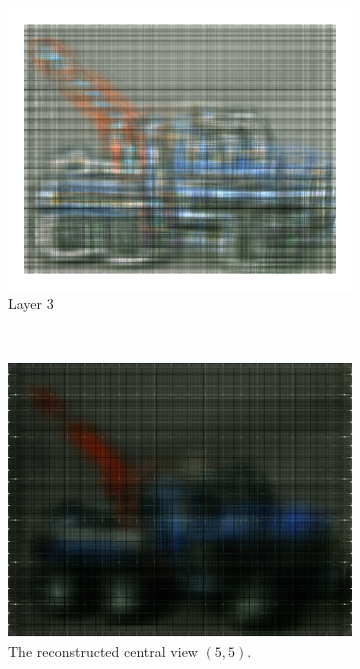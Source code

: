 \documentclass[11pt,a4paper,titlepage]{article}
\begin{document}
\begin{figure}[h]
\begin{subfigure}[c]{0.3\textwidth}
		\includegraphics[width=\textwidth]{results/legotruck_perspective_rec_3Layers_r=0/3.png}
		\caption{Layer 3}
	\end{subfigure}%
	\\
	\begin{subfigure}[t]{0.4\textwidth}
		\includegraphics[width=\textwidth]{results/legotruck_perspective_rec_3Layers_r=0/central_view_reconstruction5-5.png}
		\caption{The reconstructed central view $\left( 5, 5 \right)$.}
	\end{subfigure}%
	~
	\begin{subfigure}[t]{0.4\textwidth}

\end{subfigure}
\end{figure}
\end{document}

